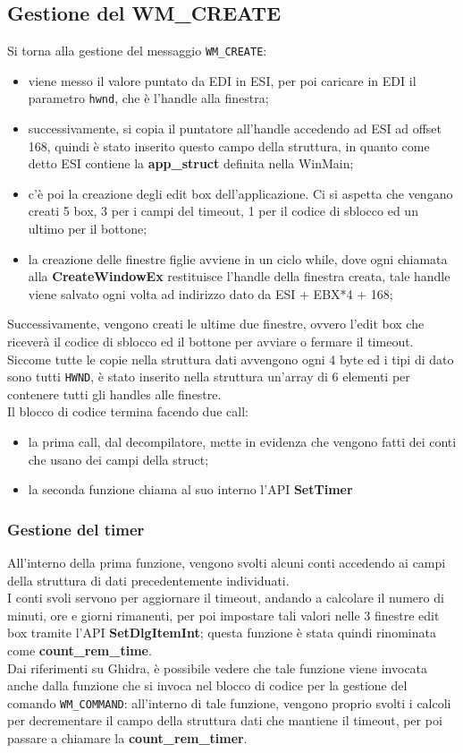 \documentclass[12pt]{extarticle}
\begin{document}
\subsection{Gestione del WM\_CREATE}
Si torna alla gestione del messaggio \texttt{WM\_CREATE}:
\begin{itemize}
\item viene messo il valore puntato da EDI in ESI, per poi caricare in EDI il parametro \texttt{hwnd}, che è l'handle alla finestra;
\item successivamente, si copia il puntatore all'handle accedendo ad ESI ad offset 168, quindi è stato inserito questo campo della struttura, in quanto come detto ESI contiene la \textbf{app\_struct} definita nella WinMain;
\item c'è poi la creazione degli edit box dell'applicazione. Ci si aspetta che vengano creati 5 box, 3 per i campi del timeout, 1 per il codice di sblocco ed un ultimo per il bottone;
\item la creazione delle finestre figlie avviene in un ciclo while, dove ogni chiamata alla \textbf{CreateWindowEx} restituisce l'handle della finestra creata, tale handle viene salvato ogni volta ad indirizzo dato da ESI + EBX*4 + 168;
\end{itemize}
Successivamente, vengono creati le ultime due finestre, ovvero l'edit box che riceverà il codice di sblocco ed il bottone per avviare o fermare il timeout.\\Siccome tutte le copie nella struttura dati avvengono ogni 4 byte ed i tipi di dato sono tutti \texttt{HWND}, è stato inserito nella struttura un'array di 6 elementi per contenere tutti gli handles alle finestre.\\Il blocco di codice termina facendo due call:
\begin{itemize}
\item la prima call, dal decompilatore, mette in evidenza che vengono fatti dei conti che usano dei campi della struct;
\item la seconda funzione chiama al suo interno l'API \textbf{SetTimer}
\end{itemize}
\subsubsection{Gestione del timer}
All'interno della prima funzione, vengono svolti alcuni conti accedendo ai campi della struttura di dati precedentemente individuati.\\I conti svoli servono per aggiornare il timeout, andando a calcolare il numero di minuti, ore e giorni rimanenti, per poi impostare tali valori nelle 3 finestre edit box tramite l'API \textbf{SetDlgItemInt}; questa funzione è stata quindi rinominata come \textbf{count\_rem\_time}.\\Dai riferimenti su Ghidra, è possibile vedere che tale funzione viene invocata anche dalla funzione che si invoca nel blocco di codice per la gestione del comando \texttt{WM\_COMMAND}: all'interno di tale funzione, vengono proprio svolti i calcoli per decrementare il campo della struttura dati che mantiene il timeout, per poi passare a chiamare la \textbf{count\_rem\_timer}.
\end{document}
